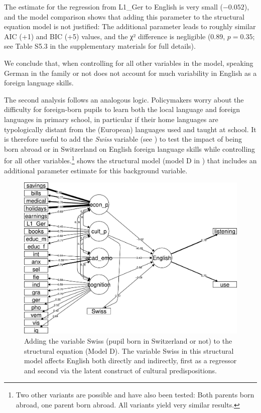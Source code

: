 \documentclass[output=paper]{langsci/langscibook}
\begin{document}
The estimate for the regression from L1\_Ger to English is very small ($-0.052$), and the model comparison shows that adding this parameter to the structural equation model is not justified: The additional parameter leads to roughly similar AIC (+1) and BIC (+5) values, and the χ² difference is negligible (0.89, $p=0.35$; see Table S5.3 in the supplementary materials for full details).

We conclude that, when controlling for all other variables in the model, speaking German in the family or not does not account for much variability in English as a foreign language skills.

The second analysis follows an analogous logic. Policymakers worry about the difficulty for foreign-born pupils to learn both the local language and foreign languages in primary school, in particular if their home languages are typologically distant from the (European) languages used and taught at school. It is therefore useful to add the \textit{Swiss} variable (see ) to test the impact of being born abroad or in Switzerland on English foreign language skills while controlling for all other variables.\footnote{Two other variants are possible and have also been tested: Both parents born abroad, one parent born abroad. All variants yield very similar results.}  shows the structural model (model D in ) that includes an additional parameter estimate for this background variable.

\begin{figure}
\includegraphics[width=\textwidth]{figures/Figure5.6.pdf}
\caption{Adding the variable Swiss (pupil born in Switzerland or not) to the structural equation (Model D). The variable \textup{Swiss} in this structural model affects English both directly and indirectly, first as a regressor and second via the latent construct of cultural predispositions.\label{fig:05:6}}
\end{figure}
\end{document}
